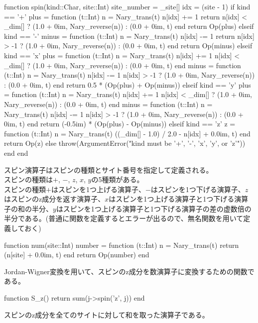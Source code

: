 \documentclass{ltjsarticle}
\begin{document}
\begin{jllisting}
function spin(kind::Char, site::Int)
  site_number = _site[]
  idx = (site - 1) %
  if kind == '+'
    plus = function (t::Int)
      n = Nary_trans(t)
      n[idx] += 1
      return n[idx] < _dim[] ? (1.0 + 0im, Nary_reverse(n)) : (0.0 + 0im, t)
    end
    return Op(plus)
  elseif kind == '-'
    minus = function (t::Int)
      n = Nary_trans(t)
      n[idx] -= 1
      return n[idx] > -1 ? (1.0 + 0im, Nary_reverse(n)) : (0.0 + 0im, t)
    end
    return Op(minus)
  elseif kind == 'x'
    plus = function (t::Int)
      n = Nary_trans(t)
      n[idx] += 1
      n[idx] < _dim[] ? (1.0 + 0im, Nary_reverse(n)) : (0.0 + 0im, t)
    end
    minus = function (t::Int)
      n = Nary_trans(t)
      n[idx] -= 1
      n[idx] > -1 ? (1.0 + 0im, Nary_reverse(n)) : (0.0 + 0im, t)
    end
    return 0.5 * (Op(plus) + Op(minus))
  elseif kind == 'y'
    plus = function (t::Int)
      n = Nary_trans(t)
      n[idx] += 1
      n[idx] < _dim[] ? (1.0 + 0im, Nary_reverse(n)) : (0.0 + 0im, t)
    end
    minus = function (t::Int)
      n = Nary_trans(t)
      n[idx] -= 1
      n[idx] > -1 ? (1.0 + 0im, Nary_reverse(n)) : (0.0 + 0im, t)
    end
    return (-0.5im) * (Op(plus) - Op(minus))
  elseif kind == 'z'
    z = function (t::Int)
      n = Nary_trans(t)
      ((_dim[] - 1.0) / 2.0 - n[idx] + 0.0im, t)
    end
    return Op(z)
  else
    throw(ArgumentError("kind must be '+', '-', 'x', 'y', or 'z'"))
  end
end
\end{jllisting}
スピン演算子はスピンの種類とサイト番号を指定して定義される。\\
スピンの種類は$+$, $-$, $z$, $x$, $y$の5種類がある。\\
スピンの種類$+$はスピンを1つ上げる演算子、$-$はスピンを1つ下げる演算子、$z$はスピンのz成分を返す演算子、$x$はスピンを1つ上げる演算子と1つ下げる演算子の和の半分、$y$はスピンを1つ上げる演算子と1つ下げる演算子の差の虚数倍の半分である。(普通に関数を定義するとエラーが出るので、無名関数を用いて定義しておく)\\
\begin{jllisting}
function num(site::Int)
  number = function (t::Int)
    n = Nary_trans(t)
    return (n[site] + 0.0im, t)
  end
  return Op(number)
end
\end{jllisting}
Jordan-Wigner変換を用いて、スピンのz成分を数演算子に変換するための関数である。\\
\begin{jllisting}
function S_z()
  return sum(j->spin('z', j))
end
\end{jllisting}
スピンのz成分を全てのサイトに対して和を取った演算子である。\\
\end{document}
